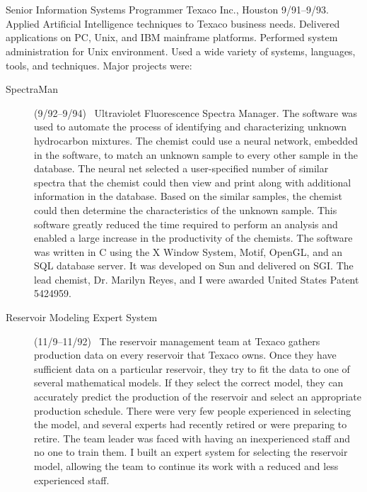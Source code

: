 \documentclass[11pt]{resume}
\begin{document}
\section{}
    {Senior Information Systems Programmer} {Texaco Inc., Houston 
      9/91--9/93.  Applied  Artificial
    Intelligence techniques to Texaco business needs.
  Delivered applications on PC, Unix, and IBM
    mainframe platforms.  Performed system administration for Unix
    environment.  Used a wide variety of systems, languages, tools,
    and techniques.
 Major projects were:}
\begin{description}
\item[SpectraMan](9/92--9/94) \ Ultraviolet Fluorescence Spectra Manager.
  The software was used to automate the process of identifying and
  characterizing unknown hydrocarbon mixtures. The chemist could use a
  neural network, embedded in the software, to match an unknown sample to
  every other sample in the database.  The neural net selected a
  user-specified number of similar spectra that the chemist could then view
  and print along with additional information in the database.  Based on the
  similar samples, the chemist could then determine the characteristics of
  the unknown sample.  This software greatly reduced the time required to
  perform an analysis and enabled a large increase in the productivity of
  the chemists.  The software was written in C using the X Window System,
  Motif, OpenGL, and an SQL database server.  It was developed on Sun and
  delivered on SGI.  The lead chemist, Dr. Marilyn Reyes, and I were awarded
  United States Patent 5424959.
   
 \item[Reservoir Modeling Expert System](11/9--11/92) \ The reservoir
   management team at Texaco gathers production data on every reservoir that
   Texaco owns.  Once they have sufficient data on a particular reservoir,
   they try to fit the data to one of several mathematical models.  If they
   select the correct model, they can accurately predict the production of
   the reservoir and select an appropriate production schedule.  There were
   very few people experienced in selecting the model, and several experts
   had recently retired or were preparing to retire. The team leader was
   faced with having an inexperienced staff and no one to train them.  I
   built an expert system for selecting the reservoir model, allowing the
   team to continue its work with a reduced and less experienced staff.
\end{description}
   
\end{document}
